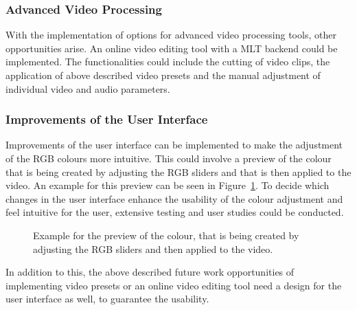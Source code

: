 \documentclass[../MasterThesis.tex]{subfiles}
\begin{document}
\subsubsection*{Advanced Video Processing}

With the implementation of options for advanced video processing tools, other opportunities arise. An online video editing tool with a MLT backend could be implemented. The functionalities could include the cutting of video clips, the application of above described video presets and the manual adjustment of individual video and audio parameters.










\subsubsection*{Improvements of the User Interface}


Improvements of the user interface can be implemented to make the adjustment of the RGB colours more intuitive. This could involve a preview of the colour that is being created by adjusting the RGB sliders and that is then applied to the video. An example for this preview can be seen in Figure~\ref{figure:UI}.
To decide which changes in the user interface enhance the usability of the colour adjustment and feel intuitive for the user, extensive testing and user studies could be conducted.

\begin{figure}[H]
	\begin{center}
		\caption[Example for the colour preview of the RGB sliders.]{Example for the preview of the colour, that is being created by adjusting the RGB sliders and then applied to the video.}
		\label{figure:UI}
	\end{center}
\end{figure}



In addition to this, the above described future work opportunities of implementing video presets or an online video editing tool need a design for the user interface as well, to guarantee the usability. 
\end{document}
